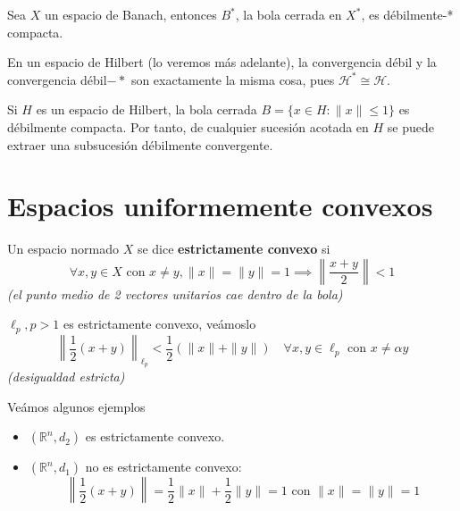\begin{teo}
    Sea $X$ un espacio de Banach, entonces $B^*$, la bola cerrada en $X^*$, es débilmente-* compacta.
\end{teo}

\begin{observacion}
    En un espacio de Hilbert (lo veremos más adelante), la convergencia débil y la convergencia débil$-*$ son exactamente la misma cosa, pues $\mathcal{H}^* \cong \mathcal{H}$.
\end{observacion}

\begin{coro}
    Si $H$ es un espacio de Hilbert, la bola cerrada $B = \{x \in H : \|x\| \le 1\}$ es débilmente compacta. Por tanto, de cualquier sucesión acotada en $H$ se puede extraer una subsucesión débilmente convergente.
\end{coro}

\section{Espacios uniformemente convexos}

\begin{definicion}
    Un espacio normado $X$ se dice \textbf{estrictamente convexo} si
    \begin{equation*}
        \forall x, y \in X \text{ con } x \neq y, \|x\| = \|y\| = 1 \implies \left\| \frac{x+y}{2} \right\| < 1
    \end{equation*}
    \textit{\small (el punto medio de 2 vectores unitarios cae dentro de la bola)}
\end{definicion}

\begin{ejemplo}
    $\ell_p, p > 1$ es estrictamente convexo, veámoslo
    \begin{equation*}
        \left\| \frac{1}{2}(x+y) \right\|_{\ell_p} < \frac{1}{2}(\|x\| + \|y\|) \quad \forall x, y \in \ell_p \text{ con } x \neq \alpha y 
    \end{equation*}
    \textit{\small (desigualdad estricta)}
\end{ejemplo}

\begin{observacion}
    Veámos algunos ejemplos
    \begin{itemize}
        \item $(\mathbb{R}^n, d_2)$ es estrictamente convexo.
        \item $(\mathbb{R}^n, d_1)$ no es estrictamente convexo: 
        $$\left\| \frac{1}{2}(x+y) \right\| = \frac{1}{2}\|x\| + \frac{1}{2}\|y\| = 1 \text{ con } \|x\| = \|y\| = 1$$
    \end{itemize}
\end{observacion}

